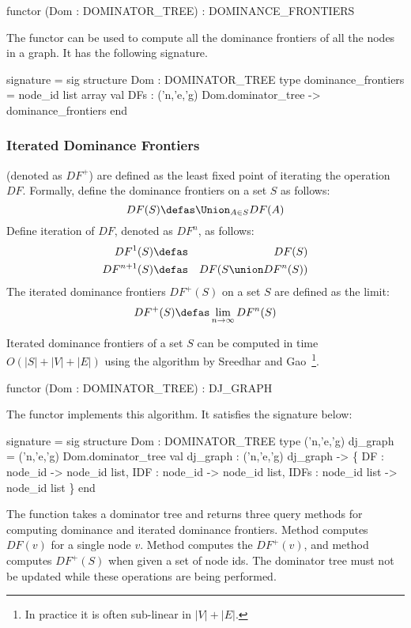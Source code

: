 \begin{SML}
  functor (Dom : DOMINATOR_TREE) : DOMINANCE_FRONTIERS
\end{SML}
The functor  can be used to
compute all the dominance frontiers of all the nodes in a graph.
It has the following signature. 

\begin{SML}
 signature  = sig
   structure Dom : DOMINATOR_TREE
   type dominance_frontiers = node_id list array
   val DFs : ('n,'e,'g) Dom.dominator_tree -> dominance_frontiers
 end
\end{SML}

\subsubsection{Iterated Dominance Frontiers}

 (denoted as $DF^+$) are defined
as the least fixed point of iterating the operation $DF$. Formally,
define the dominance frontiers on a set $S$ as follows:
\[ 
   DF(S) \defas \Union_{A \in S} DF(A) 
\]
Define iteration of $DF$, denoted as $DF^n$, as follows:
\begin{eqnarray*}
  DF^1(S)     & \defas & DF(S) \\
  DF^{n+1}(S) & \defas & DF(S \union DF^n(S)) \\
\end{eqnarray*}
The iterated dominance frontiers $DF^+(S)$ on a set $S$ are defined as
the limit:
\[  
   DF^+(S) \defas \lim_{n \to \infty} DF^n(S) 
\]

Iterated dominance frontiers of a set $S$ can be computed in
time $O(|S|+|V|+|E|)$ using the 
algorithm by Sreedhar and Gao~\cite{linear-time-IDF}\footnote{
In practice it is often sub-linear in $|V|+|E|$.}.

\begin{SML}
  functor (Dom : DOMINATOR_TREE) : DJ_GRAPH
\end{SML}
The functor  implements this algorithm.
It satisfies the signature below:
\begin{SML}
 signature  = sig
    structure Dom : DOMINATOR_TREE
    type ('n,'e,'g) dj_graph = ('n,'e,'g) Dom.dominator_tree
    val dj_graph : ('n,'e,'g) dj_graph ->
        \{  DF   : node_id -> node_id list,
           IDF  : node_id -> node_id list,
           IDFs : node_id list -> node_id list
        \}
 end
\end{SML}
The function  takes a dominator tree and returns
three query methods for computing dominance and iterated dominance frontiers.
Method  computes $DF(v)$ for a single node $v$.
Method  computes the $DF^+(v)$, and method
 computes $DF^+(S)$ when given a set of node ids.
The dominator tree must not be updated while these operations
are being performed. 

